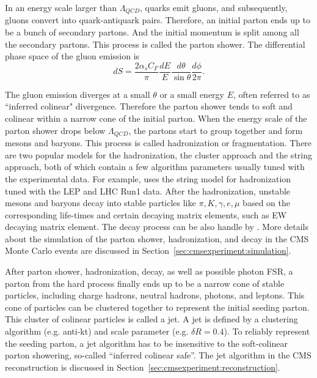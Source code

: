 In an energy scale larger than $\Lambda_{QCD}$, quarks emit gluons, and subsequently, gluons convert into quark-antiquark pairs. Therefore, an initial parton ends up to be a bunch of secondary partons. And the initial momentum is split among all the secondary partons. This process is called the parton shower. The differential phase space of the gluon emission is
\begin{equation}
    dS = \frac{2\alpha_s C_F}{\pi} \frac{dE}{E}\frac{d\theta}{\sin \theta} \frac{d\phi}{2\pi}.
\end{equation}

\noindent The gluon emission diverges at a small $\theta$ or a small energy $E$, often referred to as ``inferred colinear" divergence. Therefore the parton shower tends to soft and colinear within a narrow cone of the initial parton. 
When the energy scale of the parton shower drops below $\Lambda_{QCD}$, the partons start to group together and form mesons and baryons. This process is called hadronization or fragmentation. There are two popular models for the hadronization, the cluster approach and the string approach, both of which contain a few algorithm parameters usually tuned with the experimental data. For example, \PYTHIA uses the string model for hadronization tuned with the LEP and LHC Run1 data. After the hadronization, unstable mesons and baryons decay into stable particles like $\pi, K, \gamma, e, \mu$ based on the corresponding life-times and certain decaying matrix elements, such as EW decaying matrix element. The decay process can be also handle by \PYTHIA. More details about the simulation of the parton shower, hadronization, and decay in the CMS Monte Carlo events are discussed in Section~\ref{sec:cmsexperiment:simulation}.

After parton shower, hadronization, decay, as well as possible photon FSR, a parton from the hard process finally ends up to be a narrow cone of stable particles, including charge hadrons, neutral hadrons, photons, and leptons. This cone of particles can be clustered together to represent the initial seeding parton. This cluster of colinear particles is called a jet. A jet is defined by a clustering algorithm (e.g. anti-kt) and scale parameter (e.g. $\delta R=0.4$). To reliably represent the seeding parton, a jet algorithm has to be insensitive to the soft-colinear parton showering, so-called ``inferred colinear safe''. The jet algorithm in the CMS reconstruction is discussed in Section~\ref{sec:cmsexperiment:reconstruction}.

